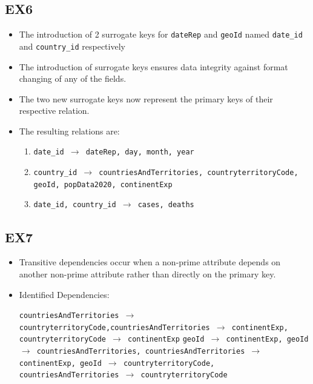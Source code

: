 \documentclass[12pt,oneside,a4paper,english]{article}
\begin{document}
\subsection{EX6}
\begin{itemize}
    \item The introduction of 2 surrogate keys for \texttt{dateRep} and \texttt{geoId} named \texttt{date\_id} and \texttt{country\_id} respectively 
    \item The introduction of surrogate keys ensures data integrity against format changing of any of the fields.
    \item The two new surrogate keys now represent the primary keys of their respective relation.
    \item The resulting relations are:
    \begin{enumerate}
        \item \texttt{date\_id $\rightarrow$ dateRep, day, month, year}
        \item \texttt{country\_id $\rightarrow$ countriesAndTerritories, countryterritoryCode, \newline geoId, popData2020, continentExp}
        \item \texttt{date\_id, country\_id $\rightarrow$ cases, deaths}
    \end{enumerate}
\end{itemize}

\subsection{EX7}
\begin{itemize}
    \item Transitive dependencies occur when a non-prime attribute depends on another non-prime attribute rather than directly on the primary key.
    \item Identified Dependencies:

    
         \texttt{countriesAndTerritories $\rightarrow$ countryterritoryCode,countriesAndTerritories $\rightarrow$ continentExp, countryterritoryCode $\rightarrow$ continentExp}
         \texttt{geoId $\rightarrow$ continentExp, geoId $\rightarrow$ countriesAndTerritories, countriesAndTerritories $\rightarrow$ continentExp, geoId $\rightarrow$ countryterritoryCode,}
        \newline
        \texttt{countriesAndTerritories $\rightarrow$ countryterritoryCode}
\end{itemize}
\end{document}
